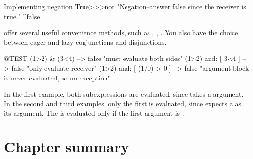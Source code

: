 \documentclass[a4paper,10pt,twoside]{book}
\begin{document}
\begin{method}{Implementing negation}
True>>>not
    "Negation--answer false since the receiver is true."
    ^false
\end{method}

 offer several useful convenience methods, such as , , . You also have the choice between eager and lazy conjunctions and disjunctions.

\begin{code}{@TEST}
(1>2) & (3<4)              --> false    "must evaluate both sides"
(1>2) and: [ 3<4 ]        --> false    "only evaluate receiver"
(1>2) and: [ (1/0) > 0 ] --> false    "argument block is never evaluated, so no exception"
\end{code}

In the first example, both  subexpressions are evaluated, since  takes a  argument.
In the second and third examples, only the first is evaluated, since  expects a  as its argument.  The  is evaluated only if the first argument is .


\section{Chapter summary}
\end{document}
